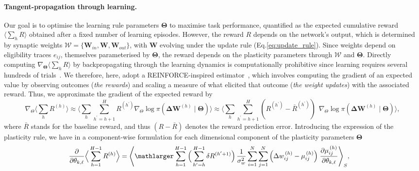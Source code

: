 \documentclass[mlabstract]{jmlr}
\begin{document}
\paragraph{Tangent-propagation through learning.} 
Our goal is to optimise the learning rule parameters $\boldsymbol{\Theta}$ to maximise task performance, quantified as the expected cumulative reward $\langle \sum_h R \rangle$ obtained after a fixed number of learning episodes.
However, the reward $R$ depends on the network’s output, which is determined by synaptic weights $\mathcal{W} = \{\mathbf{W}_{in}, \mathbf{W}, \mathbf{W}_{out}\}$, with $\mathbf{W}$ evolving under the update rule (Eq.\ref{eq:update_rule}). 
Since weights depend on eligibility traces $e_{ij}$, themselves parameterised by $\boldsymbol{\Theta}$, the reward depends on the plasticity parameters through $\mathcal{W}$ and $\boldsymbol{\Theta}$. 
Directly computing $\nabla_{\boldsymbol{\Theta}} \langle \sum_h R \rangle$ by backpropagating through the learning dynamics is computationally prohibitive since learning requires several hundreds of trials~\citep{lindsey2020learning}.
We therefore, here, adopt a REINFORCE-inspired estimator~\citep{williams1992simple}, which involves computing the gradient of an expected value by observing outcomes (\emph{the rewards}) and scaling a measure of what elicited that outcome (\emph{the weight updates}) with the associated reward. 
Thus, we approximate the gradient of the expected reward by
\begin{equation}\label{appeq:reinforce-gradient}
\nabla_\Theta \langle \sum_h  R^{(h)} \rangle \approx \langle \sum_h  \sum^H_{h^\prime=h+1} R^{(h^\prime)}  \nabla_\Theta \log \pi(\boldsymbol{\Delta}\mathbf{W}^{(h)} \mid \boldsymbol{\Theta}) \rangle \approx  \langle \sum_{h}  \sum^H_{h^\prime=h+1}  (R^{(h^\prime)} - \bar{R}^{(h^\prime)}) \;\,\nabla_\Theta \log \pi(\boldsymbol{\Delta}\mathbf{W}^{(h)}  \mid \boldsymbol{\Theta}) \rangle,
\end{equation}
where $\bar R$ stands for the baseline reward, and thus $(R - \bar{R})$ denotes the reward prediction error.
Introducing the expression of the plasticity rule, we have in a component-wise formulation for each dimensional component of the plasticity parameters $\boldsymbol{\Theta}$
\begin{align}\label{appeq:dimensional-gradient}
\frac{\partial}{\partial \theta_{k,\ell}} \Big\langle \sum_{h=1}^{H-1} R^{(h)}\Big \rangle
&= \Bigg\langle \mathlarger\sum_{h=1}^{H-1} \Big(\sum_{h^\prime=h}^{H-1}\delta R^{(h^\prime+1)} \Big)\, \frac{1}{\sigma_w^{2}}\sum_{i=1}^{N}\sum_{j=1}^{N}
   \Big(\Delta w^{\,(h)}_{ij}-\mu^{\,(h)}_{ij}\Big)\;
   \frac{\partial \mu^{\,(h)}_{ij}}{\partial \theta_{k, \ell}} \Bigg\rangle_S,
  \end{align}
\end{document}
